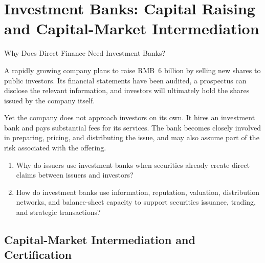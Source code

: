 \chapter{Investment Banks: Capital Raising and Capital-Market Intermediation}
\label{chap:Investment_Banks_Capital_Raising_and_Capital_Market_Intermediation}

\begin{openingcase}{Why Does Direct Finance Need Investment Banks?}

A rapidly growing company plans to raise RMB~6 billion by selling new shares to public investors. Its financial statements have been audited, a prospectus can disclose the relevant information, and investors will ultimately hold the shares issued by the company itself.

Yet the company does not approach investors on its own. It hires an investment bank and pays substantial fees for its services. The bank becomes closely involved in preparing, pricing, and distributing the issue, and may also assume part of the risk associated with the offering.

\end{openingcase}

\begin{tcolorbox}[
  enhanced,
  colback=FinanceBlue!6,
  colframe=FinanceBlue,
  boxrule=0.6pt,
  sharp corners,
  left=8pt,
  right=8pt,
  top=7pt,
  bottom=7pt,
  before skip=1em,
  after skip=1.6em,
  title=\textbf{Core Questions},
  coltitle=white,
  colbacktitle=FinanceBlue,
  fonttitle=\bfseries,
  attach boxed title to top left={xshift=6pt,yshift=-2mm},
  boxed title style={
    boxrule=0pt,
    sharp corners,
    left=5pt,
    right=5pt,
    top=2pt,
    bottom=2pt
  }
]
\begin{enumerate}[
  leftmargin=*,
  label=\textcolor{FinanceBlue}{\textbf{\arabic*.}},
  itemsep=0.55em,
  topsep=0.2em
]

\item Why do issuers use investment banks when securities already create direct claims between issuers and investors?

\item How do investment banks use information, reputation, valuation, distribution networks, and balance-sheet capacity to support securities issuance, trading, and strategic transactions?

\end{enumerate}
\end{tcolorbox}

\section{Capital-Market Intermediation and Certification}

